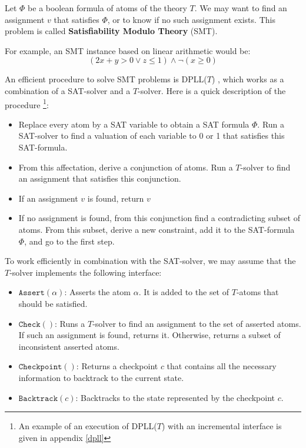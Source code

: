 \documentclass{article}
\newcommand{\iassert}[1]{\mathtt{Assert}(#1)}
\newcommand{\icheck}{\mathtt{Check}()}
\newcommand{\icheckpoint}{\mathtt{Checkpoint}()}
\newcommand{\ibacktrack}[1]{\mathtt{Backtrack}(#1)}
\begin{document}
Let $\Phi$ be a boolean formula of atoms of the theory $T$. We may want to find
an assignment $v$ that satisfies $\Phi$, or to know if no such assignment
exists. This problem is called \textbf{Satisfiability Modulo Theory} (SMT).

For example, an SMT instance based on linear arithmetic would be:
$$(2x + y > 0 \vee z \leqslant 1) \wedge \neg (x \geqslant 0)$$

An efficient procedure to solve SMT problems is DPLL($T$)
\cite[Section 3.2]{Decision2016},
which works as a combination of a SAT-solver and a $T$-solver. Here is a quick
description of the procedure
\footnote{An example of an execution of DPLL($T$) with an incremental interface
is given in appendix \ref{dpll}}:

\begin{itemize}
  \item Replace every atom by a SAT variable to obtain a SAT formula $\Phi$.
    Run a SAT-solver to find a valuation of each variable to 0 or 1 that
    satisfies this SAT-formula.
  \item From this affectation, derive a conjunction of atoms. Run a
    $T$-solver to find an assignment that satisfies this conjunction.
  \item If an assignment $v$ is found, return $v$
  \item If no assignment is found, from this conjunction find a contradicting
    subset of atoms. From this subset, derive a new constraint, add it to the
    SAT-formula $\Phi$, and go to the first step.
\end{itemize}

To work efficiently in combination with the SAT-solver, we may assume that the
$T$-solver implements the following interface:
\begin{itemize}
  \item $\iassert{\alpha}$: Asserts the atom $\alpha$. It is added to the set of
    $T$-atoms that should be satisfied.
  \item $\icheck$: Runs a $T$-solver to find an assignment to the set of
    asserted atoms. If such an assignment is found, returns it. Otherwise,
    returns a subset of inconsistent asserted atoms.
  \item $\icheckpoint$: Returns a checkpoint $c$ that contains all the necessary
    information to backtrack to the current state.
  \item $\ibacktrack{c}$: Backtracks to the state represented by the checkpoint
    $c$.
\end{itemize}
\end{document}
